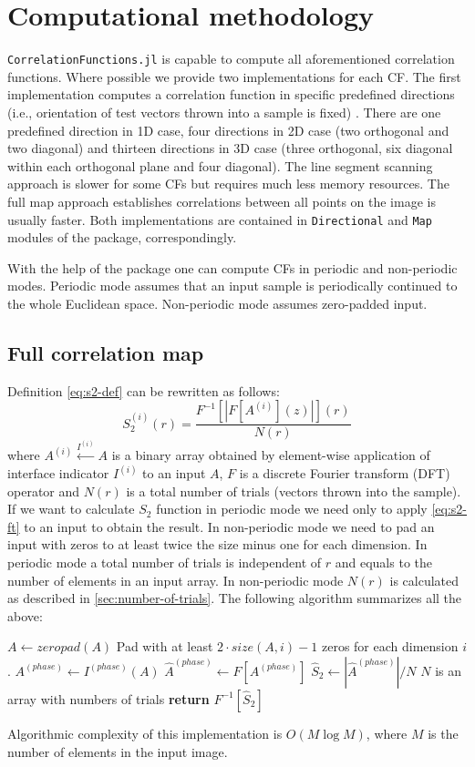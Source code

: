 \documentclass[reprint,amsmath,amssymb,aps,pre,showkeys,showpacs,nofootinbib]{revtex4-1}
\newcommand{\code}[1]{\colorbox{light-gray}{\texttt{#1}}}
\begin{document}
\section{Computational methodology}

\verb+CorrelationFunctions.jl+ is capable to compute all aforementioned correlation
functions. Where possible we provide two implementations for each CF. The first
implementation computes a correlation function in specific predefined directions
(i.e., orientation of test vectors thrown into a sample is fixed) \cite{jiao2014chawla,EPL1}.
There are one predefined direction in 1D case, four directions in 2D case 
(two orthogonal and two diagonal) and thirteen directions in 3D case (three orthogonal, 
six diagonal within each orthogonal plane and four diagonal). The line segment scanning
approach is slower for some CFs but requires much less memory resources. The full map approach
establishes correlations between all points on the image is usually faster. 
Both implementations are contained in \code{Directional} and \code{Map}
modules of the package, correspondingly.

With the help of the package one can compute CFs in periodic and non-periodic modes. 
Periodic mode assumes that an input sample is periodically continued to the whole Euclidean
space. Non-periodic mode assumes zero-padded input.

\subsection{Full correlation map}
\label{sec:map}
Definition \cref{eq:s2-def} can be rewritten as follows:
\begin{equation}
  S_2^{(i)}(r) = \frac{F^{-1} [|F [A^{(i)}](z)|] (r)}{N(r)} \label{eq:s2-ft}
\end{equation}
where $A^{(i)} \xleftarrow{I^{(i)}} A$ is a binary array obtained by element-wise
application of interface indicator $I^{(i)}$ to an input $A$, $F$ is a discrete
Fourier transform (DFT) operator and $N(r)$ is a total number of trials (vectors
thrown into the sample). If we want to calculate $S_2$ function in periodic mode
we need only to apply \cref{eq:s2-ft} to an input to obtain the result. In
non-periodic mode we need to pad an input with zeros to at least twice the size
minus one for each dimension. In periodic mode a total number of trials is
independent of $r$ and equals to the number of elements in an input array. In
non-periodic mode $N(r)$ is calculated as described in
\cref{sec:number-of-trials}. The following algorithm summarizes all the above:
\begin{algorithmic}[1]
  \State $A \gets zeropad(A)$
  \Comment Pad with at least $2\cdot size(A, i) - 1$ zeros for each dimension $i$.
  \EndIf
  \State $A^{(phase)} \gets I^{(phase)} (A)$
  \State $\hat{A}^{(phase)} \gets F[A^{(phase)}]$
  \State $\hat{S}_2 \gets |\hat{A}^{(phase)}| / N$
  \Comment $N$ is an array with numbers of trials
  \State \textbf{return} $F^{-1} [\hat{S}_2]$
  \EndProcedure
\end{algorithmic}
Algorithmic complexity of this implementation is $O(M \log M)$, where $M$ is the
number of elements in the input image.
\end{document}
